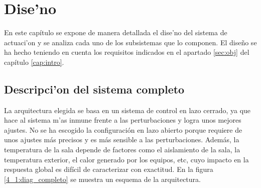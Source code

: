 \chapter{Dise'no}\label{cap:dise'no}

	En este capítulo se expone de manera detallada el dise'no del sistema de actuaci'on y se analiza cada uno de los subsistemas que lo componen. El diseño se ha hecho teniendo en cuenta los requisitos indicados en el apartado \ref{sec:obj} del capítulo \ref{cap:intro}. 

\section{Descripci'on del sistema completo}\label{sec:arq_actuador}

	La arquitectura elegida se basa en un sistema de control en lazo cerrado, ya que hace al sistema m'as inmune frente a las perturbaciones y logra unos mejores ajustes. No se ha escogido la configuración en lazo abierto porque requiere de unos ajustes más precisos y es más sensible a las perturbaciones. Además, la temperatura de la sala depende de factores como el aislamiento de la sala, la temperatura exterior, el calor generado por los equipos, etc, cuyo impacto en la respuesta global es difícil de caracterizar con exactitud. En la figura \ref{4_1:diag_completo} se muestra un esquema de la arquitectura. 

